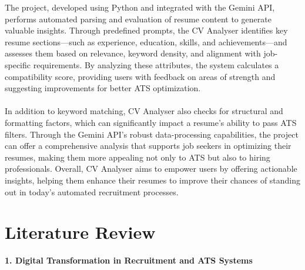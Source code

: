 \documentclass[12pt,a4paper]{report}
\begin{document}
The project, developed using Python and integrated with the Gemini API, performs automated parsing and evaluation of resume content to generate valuable insights. Through predefined prompts, the CV Analyser identifies key resume sections—such as experience, education, skills, and achievements—and assesses them based on relevance, keyword density, and alignment with job-specific requirements. By analyzing these attributes, the system calculates a compatibility score, providing users with feedback on areas of strength and suggesting improvements for better ATS optimization.\\
\\
In addition to keyword matching, CV Analyser also checks for structural and formatting factors, which can significantly impact a resume’s ability to pass ATS filters. Through the Gemini API’s robust data-processing capabilities, the project can offer a comprehensive analysis that supports job seekers in optimizing their resumes, making them more appealing not only to ATS but also to hiring professionals. Overall, CV Analyser aims to empower users by offering actionable insights, helping them enhance their resumes to improve their chances of standing out in today's automated recruitment processes.


\chapter{Literature Review}

\textbf{1. Digital Transformation in Recruitment and ATS Systems}
\end{document}
